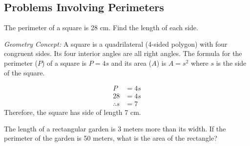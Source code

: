 \subsection*{Problems Involving Perimeters}
\begin{example}
\Item The perimeter of a square is 28 cm. Find the length of each side.

\Solution

\textit{Geometry Concept:} A square is a quadrilateral (4-sided polygon) with four congruent sides. Its four
interior angles are all right angles. The formula for the perimeter ($P$) of a square is $P = 4s$ and its area ($A$) is $A = s^2$ where $s$ is the side of the square.

\begin{align*}
P&=4s\\
28&=4s\\
\therefore s&=7
\end{align*}
Therefore, the square has side of length 7 cm.
\end{example}

\begin{example}
\item The length of a rectangular garden is 3 meters more than its width. If the perimeter of the garden is
50 meters, what is the area of the rectangle?
\end{example}
